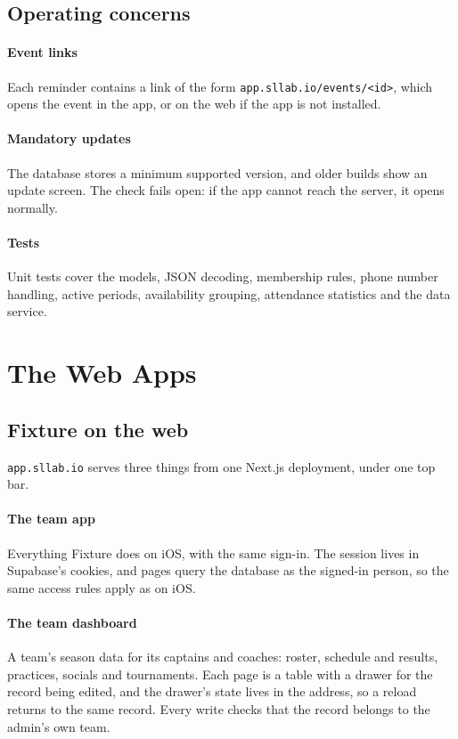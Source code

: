 \documentclass[letterpaper,11pt]{article}
\newcommand{\code}[1]{\texttt{#1}}
\begin{document}
\subsection{Operating concerns}

\paragraph{Event links} Each reminder contains a link of the form
\nolinkurl{app.sllab.io/events/<id>}, which opens the event in the app, or on the web if the app
is not installed.

\paragraph{Mandatory updates} The database stores a minimum supported version, and older builds
show an update screen. The check fails open: if the app cannot reach the server, it opens normally.

\paragraph{Tests} Unit tests cover the models, JSON decoding, membership rules, phone number
handling, active periods, availability grouping, attendance statistics and the data service.

\section{The Web Apps}\label{s:web}

\subsection{Fixture on the web}

\code{app.sllab.io} serves three things from one Next.js deployment, under one top bar.

\paragraph{The team app} Everything Fixture does on iOS, with the same sign-in. The session lives
in Supabase's cookies, and pages query the database as the signed-in person, so the same access
rules apply as on iOS.

\paragraph{The team dashboard} A team's season data for its captains and coaches: roster,
schedule and results, practices, socials and tournaments. Each page is a table with a drawer for
the record being edited, and the drawer's state lives in the address, so a reload returns to the
same record. Every write checks that the record belongs to the admin's own team.
\end{document}
